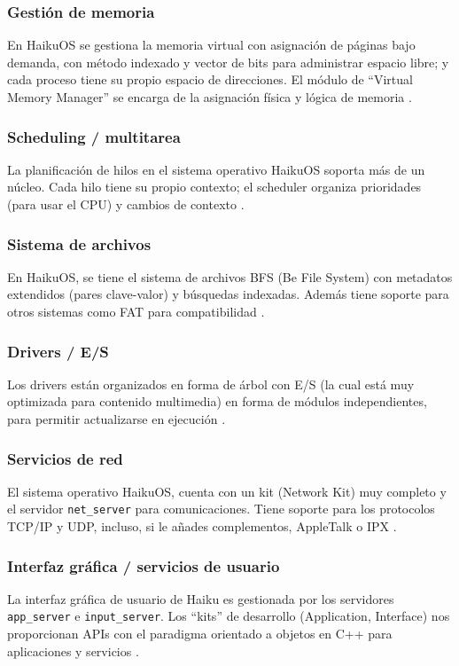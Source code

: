 \subsubsection*{Gestión de memoria}
En HaikuOS se gestiona la memoria virtual con asignación de páginas bajo demanda, con método indexado y vector de bits para administrar espacio libre; y cada proceso tiene su propio espacio de direcciones. El módulo de “Virtual Memory Manager” se encarga de la asignación física y lógica de memoria \citep{Gonzales2017haiku}.

\subsubsection*{Scheduling / multitarea}
La planificación de hilos en el sistema operativo HaikuOS soporta más de un núcleo. Cada hilo tiene su propio contexto; el scheduler organiza prioridades (para usar el CPU) y cambios de contexto \citep{2025deployment}.

\subsubsection*{Sistema de archivos}
En HaikuOS, se tiene el sistema de archivos BFS (Be File System) con metadatos extendidos (pares clave-valor) y búsquedas indexadas. Además tiene soporte para otros sistemas como FAT para compatibilidad \citep{2025deployment,haiku_GitHub}.

\subsubsection*{Drivers / E/S}
Los drivers están organizados en forma de árbol con E/S (la cual está muy optimizada para contenido multimedia) en forma de módulos independientes, para permitir actualizarse en ejecución \citep{haiku_website_2025,beinc_beos_bible_kits}.

\subsubsection*{Servicios de red}
El sistema operativo HaikuOS, cuenta con un kit (Network Kit) muy completo y el servidor \texttt{net\_server} para comunicaciones. Tiene soporte para los protocolos TCP/IP y UDP, incluso, si le añades complementos, AppleTalk o IPX \citep{2025deployment,beinc_beos_bible_kits}.

\subsubsection*{Interfaz gráfica / servicios de usuario}
La interfaz gráfica de usuario de Haiku es gestionada por los servidores \texttt{app\_server} e \texttt{input\_server}. Los “kits” de desarrollo (Application, Interface) nos proporcionan APIs con el paradigma orientado a objetos en C++ para aplicaciones y servicios \citep{2025deployment}.

